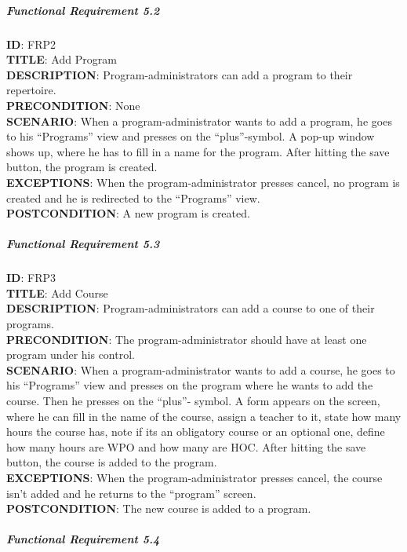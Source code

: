 \documentclass[9pt]{article}
\begin{document}
\subparagraph{Functional Requirement
5.2}\label{functional-requirement-5.2}

\textbf{ID}: FRP2\\\textbf{TITLE}: Add Program\\\textbf{DESCRIPTION}:
Program-administrators can add a program to their
repertoire.\\\textbf{PRECONDITION}: None\\\textbf{SCENARIO}: When a
program-administrator wants to add a program, he goes to his
``Programs'' view and presses on the ``plus''-symbol. A pop-up window
shows up, where he has to fill in a name for the program. After hitting
the save button, the program is created.\\\textbf{EXCEPTIONS}: When the
program-administrator presses cancel, no program is created and he is
redirected to the ``Programs'' view.\\\textbf{POSTCONDITION}: A new
program is created.

\subparagraph{Functional Requirement
5.3}\label{functional-requirement-5.3}

\textbf{ID}: FRP3\\\textbf{TITLE}: Add Course\\\textbf{DESCRIPTION}:
Program-administrators can add a course to one of their
programs.\\\textbf{PRECONDITION}: The program-administrator should have
at least one program under his control.\\\textbf{SCENARIO}: When a
program-administrator wants to add a course, he goes to his ``Programs''
view and presses on the program where he wants to add the course. Then
he presses on the ``plus''- symbol. A form appears on the screen, where
he can fill in the name of the course, assign a teacher to it, state how
many hours the course has, note if its an obligatory course or an
optional one, define how many hours are WPO and how many are HOC. After
hitting the save button, the course is added to the
program.\\\textbf{EXCEPTIONS}: When the program-administrator presses
cancel, the course isn't added and he returns to the ``program''
screen.\\\textbf{POSTCONDITION}: The new course is added to a program.

\subparagraph{Functional Requirement
5.4}\label{functional-requirement-5.4}
\end{document}

